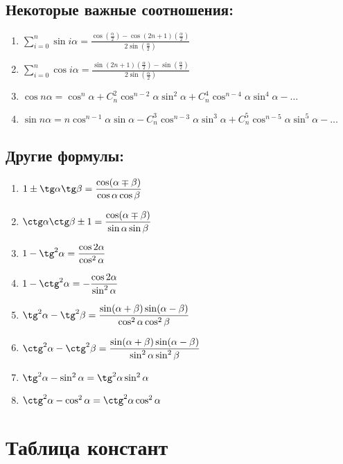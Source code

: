 \documentclass[12pt, a6paper]{extarticle}
\begin{document}
\subsection{Некоторые важные соотношения:}
\begin{enumerate}
	\item $\displaystyle \sum\limits_{i=0}^{n} \sin i\alpha = \displaystyle  \frac{\cos\left(\displaystyle \frac{\alpha}{2}\right)-\cos(2n+1)\left(\displaystyle \frac{\alpha}{2}\right)}{2\sin\left(\displaystyle \frac{\alpha}{2}\right)}$ 
	\item $\displaystyle \sum\limits_{i=0}^{n} \cos i\alpha = \displaystyle  \frac{\sin(2n+1)\left(\displaystyle \frac{\alpha}{2}\right)-\sin\left(\displaystyle \frac{\alpha}{2}\right)}{2\sin\left(\displaystyle \frac{\alpha}{2}\right)}$ 
	\item $\cos n\alpha = \cos^n \alpha + C^2_n\cos^{n-2}\alpha\sin^2\alpha + C^4_n\cos^{n-4}\alpha\sin^4\alpha - \ldots$
	\item $\sin n\alpha = n\cos^{n-1} \alpha \sin \alpha - C^3_n\cos^{n-3}\alpha\sin^3\alpha + C^5_n\cos^{n-5}\alpha\sin^5\alpha - \ldots$
\end{enumerate}
\subsection{Другие формулы:}
\begin{enumerate}
	\item $\displaystyle 1 \pm \tg\alpha \tg\beta = \frac{\cos(\alpha\mp\beta)}{\cos\alpha\cos\beta}$
	\item $\displaystyle \ctg\alpha \ctg\beta \pm 1 = \frac{\cos(\alpha\mp\beta)}{\sin\alpha\sin\beta}$
	\item $\displaystyle 1-\tg^2\alpha = \frac{\cos 2\alpha}{\cos^2\alpha}$
	\item $\displaystyle 1-\ctg^2\alpha = -\frac{\cos 2\alpha}{\sin^2\alpha}$
	\item $\displaystyle \tg^2\alpha - \tg^2\beta  = \frac{\sin(\alpha+\beta)\sin(\alpha-\beta)}{\cos^2\alpha\cos^2\beta}$
	\item $\displaystyle \ctg^2\alpha - \ctg^2\beta  = \frac{\sin(\alpha+\beta)\sin(\alpha-\beta)}{\sin^2\alpha\sin^2\beta}$
	\item $\tg^2\alpha - \sin^2\alpha = \tg^2\alpha \sin^2\alpha $
	\item $\ctg^2\alpha - \cos^2\alpha = \ctg^2\alpha \cos^2\alpha $
\end{enumerate} 

\newpage
\section{Таблица констант}
\end{document}
